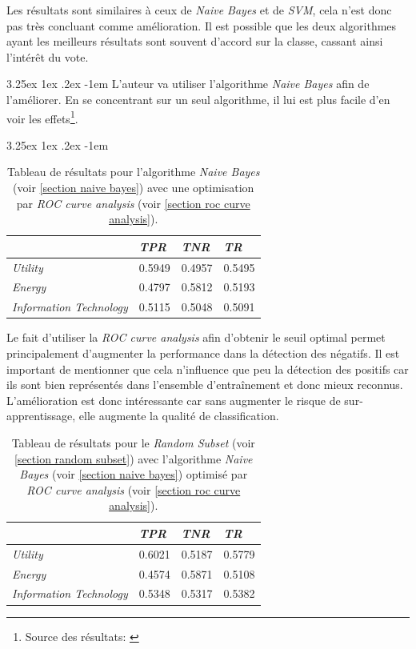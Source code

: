 \documentclass[a4paper, 11pt]{article}
\makeatletter
\renewcommand\paragraph{\@startsection{paragraph}{5}{\z@}%
  {3.25ex \@plus1ex \@minus.2ex}%
  {-1em}%
  {\normalfont\normalsize\bfseries}}
\makeatother
\begin{document}
Les résultats sont similaires à ceux de \textit{Naive Bayes} et de \textit{SVM}, cela n'est donc pas très
concluant comme amélioration. Il est possible que les deux algorithmes ayant les meilleurs résultats sont
souvent d'accord sur la classe, cassant ainsi l'intérêt du vote.

\paragraph{}
L'auteur va utiliser l'algorithme \textit{Naive Bayes} afin de l'améliorer. En se concentrant sur un seul algorithme,
il lui est plus facile d'en voir les effets\footnote{Source des résultats: \cite{machine_learning_automated_trading}}.

\paragraph{}
\begin{table}[h!]
	\centering
\begin{tabular}{|l|l|l|l|}
	\hline
	\ & \textit{TPR} & \textit{TNR} & \textit{TR}\\
	\hline
	\textit{Utility} & 0.5949 & 0.4957 & 0.5495 \\
	\hline
	\textit{Energy} & 0.4797 & 0.5812 & 0.5193\\
	\hline
	\textit{Information Technology} & 0.5115 & 0.5048 & 0.5091\\
	\hline
\end{tabular}
\caption{Tableau de résultats pour l'algorithme \textit{Naive Bayes} (voir \ref{section naive bayes}) avec une optimisation
par \textit{ROC curve analysis} (voir \ref{section roc curve analysis}).}
\end{table}

Le fait d'utiliser la \textit{ROC curve analysis} afin d'obtenir le seuil optimal permet principalement d'augmenter
la performance dans la détection des négatifs. Il est important de mentionner que cela n'influence que peu
la détection des positifs car ils sont bien représentés dans l'ensemble d'entraînement et donc mieux reconnus.
L'amélioration est donc intéressante car sans augmenter le risque de sur-apprentissage, elle augmente la qualité
de classification.

\begin{table}[h!]
	\centering
\begin{tabular}{|l|l|l|l|}
	\hline
	\ & \textit{TPR} & \textit{TNR} & \textit{TR}\\
	\hline
	\textit{Utility} & 0.6021 & 0.5187 & 0.5779 \\
	\hline
	\textit{Energy} & 0.4574 & 0.5871 & 0.5108\\
	\hline
	\textit{Information Technology} & 0.5348 & 0.5317 & 0.5382\\
	\hline
\end{tabular}
\caption{Tableau de résultats pour le \textit{Random Subset} (voir \ref{section random subset}) avec l'algorithme 
\textit{Naive Bayes} (voir \ref{section naive bayes}) optimisé par \textit{ROC curve analysis} 
(voir \ref{section roc curve analysis}).}
\end{table}
\end{document}
